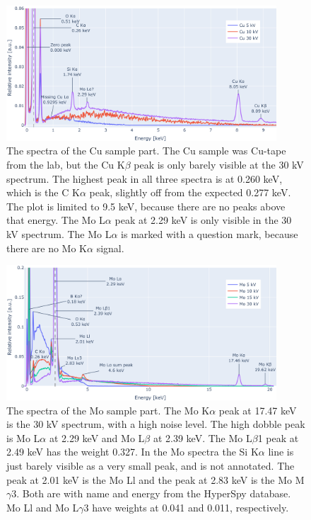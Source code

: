 \begin{figure}[h]
    \centering
    \includegraphics[width=0.90\textwidth]{figures/each_spectra_not_on_github/Cu_everything.png}
    \caption{
        The spectra of the Cu sample part.
        The Cu sample was Cu-tape from the lab, but the Cu K$\beta$ peak is only barely visible at the 30 kV spectrum.
        The highest peak in all three spectra is at 0.260 keV, which is the C K$\alpha$ peak, slightly off from the expected 0.277 keV.
        The plot is limited to 9.5 keV, because there are no peaks above that energy.
        The Mo L$\alpha$ peak at 2.29 keV is only visible in the 30 kV spectrum.
        The Mo L$\alpha$ is marked with a question mark, because there are no Mo K$\alpha$ signal.
    }
    \label{fig:results:Spectra_Cu}
\end{figure}


\begin{figure}[h!]
    \centering
    \includegraphics[width=0.90\textwidth]{figures/each_spectra_not_on_github/Mo_everything.png}
    \caption{
        The spectra of the Mo sample part.
        The Mo K$\alpha$ peak at 17.47 keV is the 30 kV spectrum, with a high noise level.
        The high dobble peak is Mo L$\alpha$ at 2.29 keV and Mo L$\beta$ at 2.39 keV.
        The Mo L$\beta$1 peak at 2.49 keV has the weight 0.327.
        In the Mo spectra the Si K$\alpha$ line is just barely visible as a very small peak, and is not annotated.
        The peak at 2.01 keV is the Mo Ll and the peak at 2.83 keV is the Mo M$\gamma$3.
        Both are with name and energy from the HyperSpy database.
        Mo Ll and Mo L$\gamma$3 have weights at 0.041 and 0.011, respectively.
    }
    \label{fig:results:Spectra_Mo}
\end{figure}

